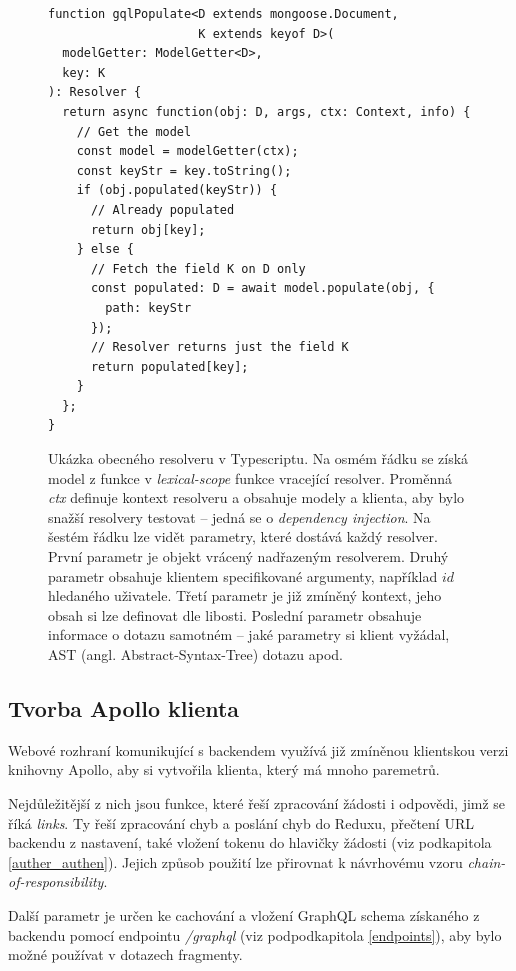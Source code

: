\begin{figure}[!htb]
\lstset{language=Javascript}
\begin{lstlisting}
function gqlPopulate<D extends mongoose.Document,
                     K extends keyof D>(
  modelGetter: ModelGetter<D>,
  key: K
): Resolver {
  return async function(obj: D, args, ctx: Context, info) {
    // Get the model
    const model = modelGetter(ctx);
    const keyStr = key.toString();
    if (obj.populated(keyStr)) {
      // Already populated
      return obj[key];
    } else {
      // Fetch the field K on D only
      const populated: D = await model.populate(obj, {
        path: keyStr
      });
      // Resolver returns just the field K
      return populated[key];
    }
  };
}
\end{lstlisting}
\caption[Ukázka obecného resolveru v Typescriptu.]{Ukázka obecného resolveru v Typescriptu. Na osmém řádku se získá model z funkce v \textit{lexical-scope} funkce vracející resolver. Proměnná \textit{ctx} definuje kontext resolveru a obsahuje modely a klienta, aby bylo snažší resolvery testovat -- jedná se o \textit{dependency injection}. Na šestém řádku lze vidět parametry, které dostává každý resolver. První parametr je objekt vrácený nadřazeným resolverem. Druhý parametr obsahuje klientem specifikované argumenty, například $id$ hledaného uživatele. Třetí parametr je již zmíněný kontext, jeho obsah si lze definovat dle libosti. Poslední parametr obsahuje informace o dotazu samotném -- jaké parametry si klient vyžádal, AST (angl. Abstract-Syntax-Tree) dotazu apod.}
\label{fig:generic_resolver}
\end{figure}

\subsection{Tvorba Apollo klienta}

\noindent
Webové rozhraní komunikující s backendem využívá již zmíněnou klientskou verzi knihovny Apollo, aby si vytvořila klienta,
který má mnoho paremetrů.

Nejdůležitější z nich jsou funkce, které řeší zpracování žádosti i odpovědi, jimž se říká \textit{links}. \citep{ApolloLinks}
Ty řeší zpracování chyb a poslání chyb do Reduxu, přečtení URL backendu z nastavení, také vložení tokenu do hlavičky žádosti
(viz podkapitola \ref{auther_authen}).
Jejich způsob použití lze přirovnat k návrhovému vzoru \textit{chain-of-responsibility}.

Další parametr je určen ke cachování a vložení GraphQL schema získaného z backendu pomocí
endpointu \textit{/graphql} (viz podpodkapitola \ref{endpoints}), aby bylo možné používat v dotazech fragmenty.

